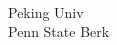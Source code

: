 \documentclass[a4paper]{article}
\begin{document}
\begin{multicols*}{2}
\begin{footnotesize}
\\ Peking Univ \\ Penn State Berk
\end{footnotesize}
\end{multicols*}
\end{document}
